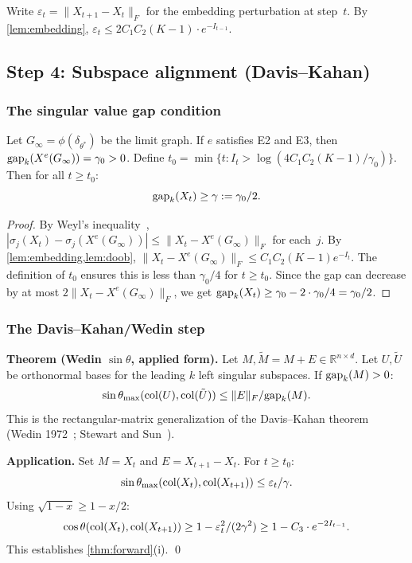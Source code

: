 \documentclass{../shared/primo}
\begin{document}
Write $\varepsilon_t = \|X_{t+1} - X_t\|_F$ for the embedding perturbation at step~$t$. By \cref{lem:embedding}, $\varepsilon_t \leq 2C_1 C_2 (K{-}1) \cdot e^{-I_{t-1}}$.

\subsection{Step 4: Subspace alignment (Davis--Kahan)}

\subsubsection{The singular value gap condition}

\begin{proposition}\label{prop:gap}
Let $G_\infty = \phi(\delta_{\theta^*})$ be the limit graph. If $e$ satisfies E2 and E3, then $\mathrm{gap}_k(X^e(G_\infty)) = \gamma_0 > 0$. Define $t_0 = \min\{t : I_t > \log(4C_1 C_2 (K{-}1)/\gamma_0)\}$. Then for all $t \geq t_0$:
\[
\mathrm{gap}_k(X_t) \geq \gamma := \gamma_0/2.
\]
\end{proposition}

\begin{proof}
By Weyl's inequality~\cite{weyl1912asymptotische}, $|\sigma_j(X_t) - \sigma_j(X^e(G_\infty))| \leq \|X_t - X^e(G_\infty)\|_F$ for each~$j$. By \cref{lem:embedding,lem:doob}, $\|X_t - X^e(G_\infty)\|_F \leq C_1 C_2 (K{-}1) e^{-I_t}$. The definition of $t_0$ ensures this is less than $\gamma_0/4$ for $t \geq t_0$. Since the gap can decrease by at most $2\|X_t - X^e(G_\infty)\|_F$, we get $\mathrm{gap}_k(X_t) \geq \gamma_0 - 2 \cdot \gamma_0/4 = \gamma_0/2$.
\end{proof}

\subsubsection{The Davis--Kahan/Wedin step}

\textbf{Theorem (Wedin $\sin\theta$, applied form).} Let $M, \tilde{M} = M + E \in \mathbb{R}^{n \times d}$. Let $U, \tilde{U}$ be orthonormal bases for the leading $k$ left singular subspaces. If $\mathrm{gap}_k(M) > 0$:
\[
\sin\theta_{\max}(\operatorname{col}(U), \operatorname{col}(\tilde{U})) \leq \|E\|_F / \mathrm{gap}_k(M).
\]
This is the rectangular-matrix generalization of the Davis--Kahan theorem~\cite{davis1970rotation} (Wedin 1972~\cite{wedin1972perturbation}; Stewart and Sun~\cite{stewart1990matrix}).

\textbf{Application.} Set $M = X_t$ and $E = X_{t+1} - X_t$. For $t \geq t_0$:
\[
\sin\theta_{\max}(\operatorname{col}(X_t), \operatorname{col}(X_{t+1})) \leq \varepsilon_t / \gamma.
\]
Using $\sqrt{1 - x} \geq 1 - x/2$:
\[
\cos\theta(\operatorname{col}(X_t), \operatorname{col}(X_{t+1})) \geq 1 - \varepsilon_t^2 / (2\gamma^2) \geq 1 - C_3 \cdot e^{-2I_{t-1}}.
\]
This establishes \cref{thm:forward}(i). \qed
\end{document}

